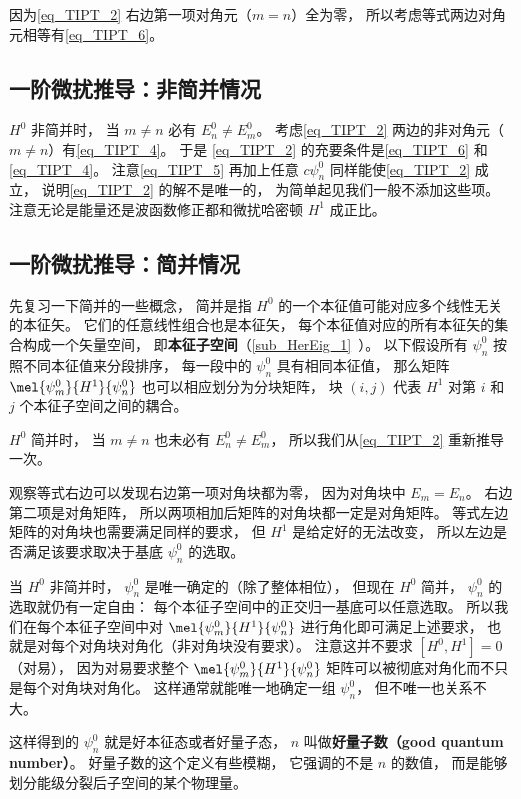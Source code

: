 因为\autoref{eq_TIPT_2} 右边第一项对角元（$m = n$）全为零， 所以考虑等式两边对角元相等有\autoref{eq_TIPT_6}。

\subsection{一阶微扰推导：非简并情况}\label{sub_TIPT_1}
$H^0$ 非简并时， 当 $m\ne n$ 必有 $E_n^0 \ne E_m^0$。  考虑\autoref{eq_TIPT_2} 两边的非对角元（$m \ne n$）有\autoref{eq_TIPT_4}。 于是 \autoref{eq_TIPT_2} 的充要条件是\autoref{eq_TIPT_6} 和\autoref{eq_TIPT_4}。 注意\autoref{eq_TIPT_5} 再加上任意 $c \psi_n^0$ 同样能使\autoref{eq_TIPT_2} 成立， 说明\autoref{eq_TIPT_2} 的解不是唯一的， 为简单起见我们一般不添加这些项。 注意无论是能量还是波函数修正都和微扰哈密顿 $H^1$ 成正比。

\subsection{一阶微扰推导：简并情况}
先复习一下简并的一些概念， 简并是指 $H^0$ 的一个本征值可能对应多个线性无关的本征矢。 它们的任意线性组合也是本征矢， 每个本征值对应的所有本征矢的集合构成一个矢量空间， 即\textbf{本征子空间}（\autoref{sub_HerEig_1}~）。 以下假设所有 $\psi_n^0$ 按照不同本征值来分段排序， 每一段中的 $\psi_n^0$ 具有相同本征值， 那么矩阵 $\mel{\psi_m^0}{H^1}{\psi_n^0}$ 也可以相应划分为分块矩阵， 块 $(i,j)$ 代表 $H^1$ 对第 $i$ 和 $j$ 个本征子空间之间的耦合。

$H^0$ 简并时， 当 $m\ne n$ 也未必有 $E_n^0 \ne E_m^0$， 所以我们从\autoref{eq_TIPT_2} 重新推导一次。

观察等式右边可以发现右边第一项对角块都为零， 因为对角块中 $E_m = E_n$。 右边第二项是对角矩阵， 所以两项相加后矩阵的对角块都一定是对角矩阵。 等式左边矩阵的对角块也需要满足同样的要求， 但 $H^1$ 是给定好的无法改变， 所以左边是否满足该要求取决于基底 $\psi_n^0$ 的选取。

当 $H^0$ 非简并时， $\psi_n^0$ 是唯一确定的（除了整体相位）， 但现在 $H^0$ 简并， $\psi_n^0$ 的选取就仍有一定自由： 每个本征子空间中的正交归一基底可以任意选取。 所以我们在每个本征子空间中对 $\mel{\psi_m^0}{H^1}{\psi_n^0}$ 进行角化即可满足上述要求， 也就是对每个对角块对角化（非对角块没有要求）。 注意这并不要求 $[H^0, H^1] = 0$ （对易）， 因为对易要求整个 $\mel{\psi_m^0}{H^1}{\psi_n^0}$ 矩阵可以被彻底对角化而不只是每个对角块对角化。 这样通常就能唯一地确定一组 $\psi_n^0$， 但不唯一也关系不大。

这样得到的 $\psi_n^0$ 就是好本征态或者好量子态， $n$ 叫做\textbf{好量子数（good quantum number）}。 好量子数的这个定义有些模糊， 它强调的不是 $n$ 的数值， 而是能够划分能级分裂后子空间的某个物理量。

